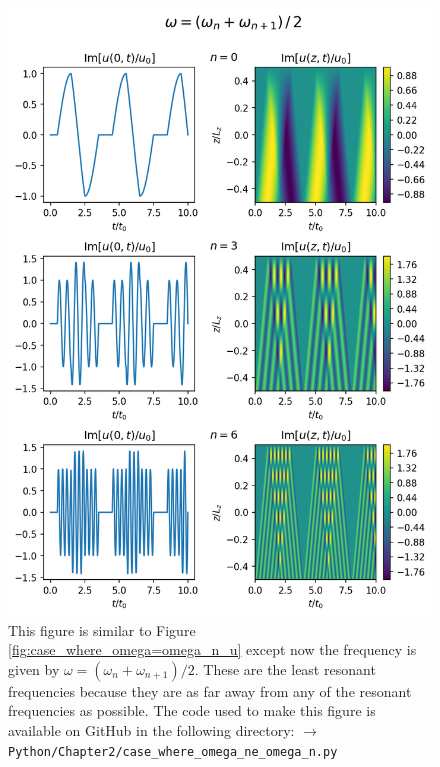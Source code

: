 \begin{figure}
    \centering
    \vspace{-20pt}
    \includegraphics[width=\textwidth,height=0.9\textheight,keepaspectratio]{figures/chapter02/case_where_omega_ne_omega_n_u.png}
    \vspace{-10pt}
    \caption{This figure is similar to Figure \ref{fig:case_where_omega=omega_n_u} except now the frequency is given by $\omega=(\omega_n+\omega_{n+1})/2$. These are the least resonant frequencies because they are as far away from any of the resonant frequencies as possible. The code used to make this figure is available on GitHub in the following directory:\newline
    \texttt{$\rightarrow$ Python/Chapter2/case\_where\_omega\_ne\_omega\_n.py}}
    \vspace{-30pt}
    \label{fig:case_where_omega_ne_omega_n_u}
\end{figure}

